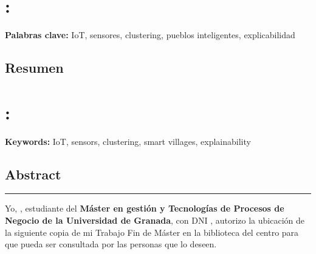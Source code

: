 \documentclass[
11pt, %
english, %
singlespacing, %
headsepline, %
]{MastersDoctoralThesis} %
\begin{document}
\section*{\ttitle: \thesissubtitle}

\authorname

{\vspace{1cm}\noindent\large \textbf{Palabras clave:} IoT, sensores, clustering, pueblos inteligentes, explicabilidad \keywordnames}

\subsection*{Resumen}




\pagestyle{empty}
\cleardoublepage
\section*{\Ettitle: \Ethesissubtitle}

\authorname

{\vspace{1cm}\noindent\large \textbf{Keywords:} IoT, sensors, clustering, smart villages, explainability \keywordnames}

\subsection*{Abstract}





\pagestyle{empty}
\cleardoublepage

\par\noindent\rule{\textwidth}{2pt}

\vspace{2cm}

{\large
  Yo, \textbf{\authorname}, estudiante del \textbf{Máster en gestión y Tecnologías de Procesos de Negocio de la Universidad de Granada}, con DNI \dni, autorizo la ubicación de la siguiente copia de mi Trabajo Fin de Máster en la biblioteca del centro para que pueda ser consultada por las personas que lo deseen.
}
\vfill
\end{document}
